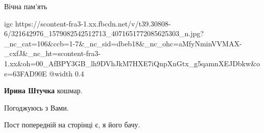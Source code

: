 Вічна пам'ять 🖤🖤🖤

\ifcmt
  igc https://scontent-fra3-1.xx.fbcdn.net/v/t39.30808-6/321642976_1579082542512713_4071651772085625303_n.jpg?_nc_cat=106&ccb=1-7&_nc_sid=dbeb18&_nc_ohc=aMfyNminVVMAX-_cxfJ&_nc_ht=scontent-fra3-1.xx&oh=00_AfBPY3GB_lh9DVhJkM7HXE7iQnpXnGtx_g5qamnXEJDbkw&oe=63FAD90E
	@width 0.4
\fi

\begin{itemize} %
\textbf{Ирина Штучка} кошмар.
\end{itemize} %


Погоджуюсь з Вами.

Пост попередній на сторінці є, я його бачу.
